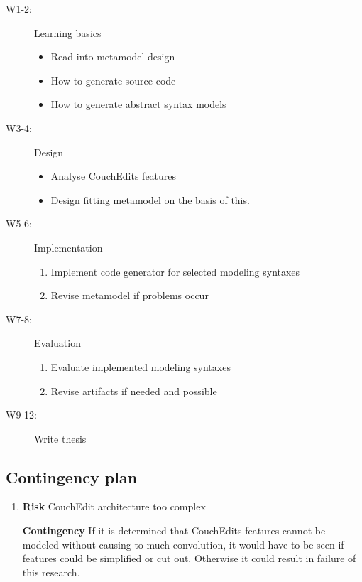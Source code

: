 \documentclass[10pt,a4paper,oneside]{scrartcl}
\newcommand\hint[2]{
\ifthenelse{\boolean{showhints}}{
\begin{center}
\colorbox{black!10}{
\begin{minipage}{.963\textwidth}
#2\hfill\textbf{#1}
\end{minipage}
}\end{center}}{}
}
\begin{document}
\begin{description}
  \item[W1-2:] Learning basics
        \begin{itemize}
          \item Read into metamodel design
          \item How to generate source code
          \item How to generate abstract syntax models
        \end{itemize}
  \item[W3-4:] Design
        \begin{itemize}
          \item Analyse CouchEdits features
          \item Design fitting metamodel on the basis of this.
        \end{itemize}
  \item[W5-6:] Implementation
        \begin{enumerate}
          \item Implement code generator for selected modeling syntaxes
          \item Revise metamodel if problems occur
        \end{enumerate}
  \item[W7-8:] Evaluation
        \begin{enumerate}
          \item Evaluate implemented modeling syntaxes
          \item Revise artifacts if needed and possible
        \end{enumerate}
  \item[W9-12:] Write thesis
\end{description}

\subsection{Contingency plan}
\label{sub:contingency}


\begin{enumerate}
  \item \textbf{Risk} CouchEdit architecture too complex

        \textbf{Contingency} If it is determined that CouchEdits features cannot be modeled without causing to much convolution, it would have to be seen if features could be simplified or cut out. Otherwise it could result in failure of this research.
\end{enumerate}

\nocite{*}
\printbibliography
\end{document}
